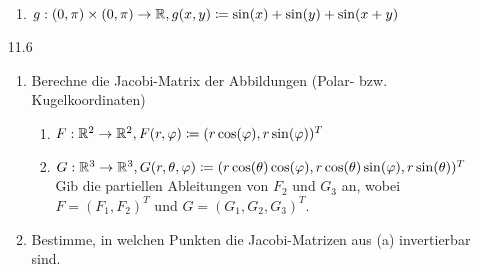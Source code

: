 \documentclass{../HM}
\begin{document}
\begin{enumerate}
\begin{enumerate}
			\item $g:(0,\pi)\times(0,\pi)\to \mathbb{R}, g(x,y) \coloneqq \sin(x) + \sin(y) + \sin(x+y)$
			
		\end{enumerate}
		\item[11.6]
		\begin{enumerate}
			\item Berechne die Jacobi-Matrix der Abbildungen (Polar- bzw. Kugelkoordinaten)
			\begin{enumerate}
				\item $F:\mathbb{R}^2 \to \mathbb{R}^2,F(r,\varphi)\coloneqq(r \cos(\varphi), r\sin(\varphi))^T$
				\item $G: \mathbb{R}^3 \to \mathbb{R}^3, G(r, \theta, \varphi)\coloneqq(r \cos(\theta) \cos(\varphi), r\cos(\theta)\sin(\varphi),r\sin(\theta))^T$\\
				Gib die partiellen Ableitungen von $F_2$ und $G_3$ an, wobei $F = (F_1 , F_2 )^T$ und $G = (G_1 , G_2 , G_3 )^T$.
			\end{enumerate}
		\item Bestimme, in welchen Punkten die Jacobi-Matrizen aus (a) invertierbar sind.
		\end{enumerate}

	\end{enumerate}
\end{document}

